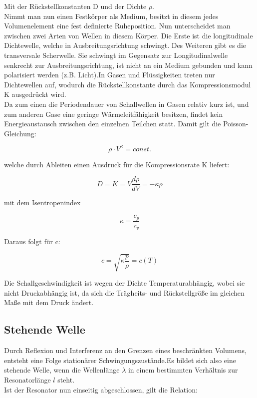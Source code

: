 \documentclass{article}
\begin{document}
{Mit der Rückstellkonstanten D und der Dichte \(\rho\).\\
Nimmt man nun einen Festkörper als Medium, besitzt in diesem jedes Volumenelement eine fest definierte Ruheposition. Nun unterscheidet man zwischen zwei Arten von Wellen in diesem Körper. Die Erste ist die longitudinale Dichtewelle, welche in Ausbreitungsrichtung schwingt. Des Weiteren gibt es die transversale Scherwelle. Sie schwingt im Gegensatz zur Longitudinalwelle senkrecht zur Ausbreitungsrichtung, ist nicht an ein Medium gebunden und kann polarisiert werden (z.B. Licht).In Gasen und Flüssigkeiten treten nur Dichtewellen auf, wodurch die Rückstellkonstante durch das Kompressionsmodul K ausgedrückt wird.\\
Da zum einen die Periodendauer von Schallwellen in Gasen relativ kurz ist, und zum anderen Gase eine geringe Wärmeleitfähigkeit besitzen, findet kein Energieaustausch zwischen den einzelnen Teilchen statt. Damit gilt die Poisson-Gleichung:

\begin{equation}
\label{rho}
\rho \cdot V^{\kappa} = const.
\end{equation}

welche durch Ableiten einen Ausdruck für die Kompressionsrate K liefert:

\begin{equation}
\label{K}
D = K = V \frac{d\rho}{dV}=-\kappa \rho
\end{equation}

mit dem Isentropenindex 

\begin{equation}
\label{kappa}
\kappa = \frac{c_{p}}{c_{v}}
\end{equation}

Daraus folgt für c:

\begin{equation}
c=\sqrt{\kappa\frac{p}{\rho}}=c(T)
\end{equation}

Die Schallgeschwindigkeit ist wegen der Dichte Temperaturabhängig, wobei sie nicht Druckabhängig ist, da sich die Trägheits- und Rückstellgröße im gleichen Maße mit dem Druck ändert.

\newpage
\subsection{Stehende Welle}
Durch Reflexion und Interferenz an den Grenzen eines beschränkten Volumens, entsteht eine Folge stationärer Schwingungszustände.Es bildet sich also eine stehende Welle, wenn die Wellenlänge \(\lambda\) in einem bestimmten Verhältnis zur Resonatorlänge \(l\) steht.\\
Ist der Resonator nun einseitig abgeschlossen, gilt die Relation:

}
\end{document}
